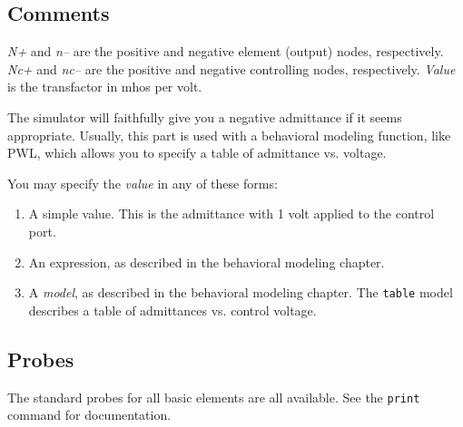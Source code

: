 \subsection{Comments}

{\it N+} and {\it n--} are the positive and negative element (output) nodes,
respectively.  {\it Nc+} and {\it nc--} are the positive and negative
controlling nodes, respectively.  {\it Value} is the transfactor in
mhos per volt.

The simulator will faithfully give you a negative admittance if it
seems appropriate.  Usually, this part is used with a behavioral
modeling function, like PWL, which allows you to specify a table of
admittance vs. voltage.

You may specify the {\it value} in any of these forms:

\begin{enumerate}
  
\item
A simple value.  This is the admittance with 1 volt applied
to the control port.
  
\item
An expression, as described in the behavioral modeling chapter.

\item
A {\it model}, as described in the behavioral modeling chapter.  The
{\tt table} model describes a table of admittances vs. control voltage.

\end{enumerate}
\subsection{Probes}

The standard probes for all basic elements are all available.  See the
{\tt print} command for documentation.
